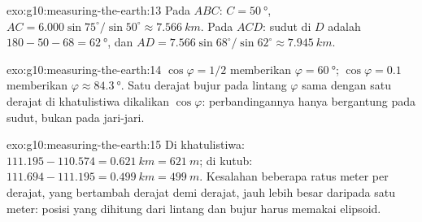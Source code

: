 \begin{solution}{exo:g10:measuring-the-earth:13}
Pada $ABC$: $C = \qty{50}{\degree}$, $AC = 6.000 \sin 75^\circ/\sin 50^\circ
\approx \qty{7.566}{km}$. Pada $ACD$: sudut di $D$ adalah $180 - 50 - 68 =
\qty{62}{\degree}$, dan $AD = 7.566 \sin 68^\circ/\sin 62^\circ \approx
\qty{7.945}{km}$.
\end{solution}

\begin{solution}{exo:g10:measuring-the-earth:14}
$\cos\varphi = 1/2$ memberikan $\varphi = \qty{60}{\degree}$; $\cos\varphi = 0.1$
memberikan $\varphi \approx \qty{84.3}{\degree}$. Satu derajat bujur pada
lintang $\varphi$ sama dengan satu derajat di khatulistiwa dikalikan
$\cos\varphi$: perbandingannya hanya bergantung pada sudut, bukan pada
jari-jari.
\end{solution}

\begin{solution}{exo:g10:measuring-the-earth:15}
Di khatulistiwa: $111.195 - 110.574 = \qty{0.621}{km} = \qty{621}{m}$; di
kutub: $111.694 - 111.195 = \qty{0.499}{km} = \qty{499}{m}$. Kesalahan beberapa
ratus meter per derajat, yang bertambah derajat demi derajat, jauh lebih besar
daripada satu meter: posisi yang dihitung dari lintang dan bujur harus memakai
elipsoid.
\end{solution}

